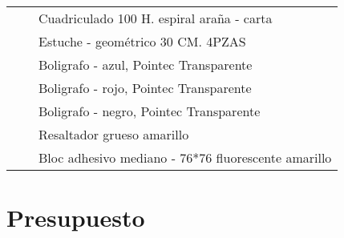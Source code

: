 \documentclass{article}
\begin{document}
\begin{table}[htbp]
{\begin{tabular}{|c|c|l|}
\cmidrule{3-3}          &       & Cuadriculado 100 H. espiral araña - carta \\
\cmidrule{3-3}          &       & Estuche - geométrico 30 CM. 4PZAS \\
\cmidrule{3-3}          &       & Boligrafo - azul, Pointec Transparente \\
\cmidrule{3-3}          &       & Boligrafo - rojo, Pointec Transparente \\
\cmidrule{3-3}          &       & Boligrafo - negro, Pointec Transparente \\
\cmidrule{3-3}          &       & Resaltador grueso amarillo \\
\cmidrule{3-3}          &       & Bloc adhesivo mediano - 76*76 fluorescente amarillo \\
    \bottomrule
    \end{tabular}}%
  \label{tab:addlabel}%
\end{table}%

\newpage

\section{Presupuesto}
\end{document}
